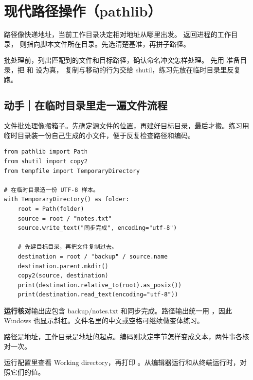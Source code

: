 \par


\section[现代路径操作]{现代路径操作（pathlib）}

路径像快递地址，当前工作目录决定相对地址从哪里出发。
 返回进程的工作目录，
则指向脚本文件所在目录。先选清楚基准，再拼子路径。

批处理前，列出匹配到的文件和目标路径，确认命名冲突怎样处理。
先用  准备目录，把  和  设为真，
复制与移动的行为交给 shutil，练习先放在临时目录里反复跑。

\subsection*{动手｜在临时目录里走一遍文件流程}

文件批处理像搬箱子。先确定源文件的位置，再建好目标目录，最后才搬。练习用临时目录装一份自己生成的小文件，便于反复检查路径和编码。

\begin{lstlisting}[title={\code{copy_note.py}}]
from pathlib import Path
from shutil import copy2
from tempfile import TemporaryDirectory

# 在临时目录造一份 UTF-8 样本。
with TemporaryDirectory() as folder:
    root = Path(folder)
    source = root / "notes.txt"
    source.write_text("同步完成", encoding="utf-8")

    # 先建目标目录，再把文件复制过去。
    destination = root / "backup" / source.name
    destination.parent.mkdir()
    copy2(source, destination)
    print(destination.relative_to(root).as_posix())
    print(destination.read_text(encoding="utf-8"))
\end{lstlisting}

\textbf{运行核对}\enspace 输出应包含 backup/notes.txt 和同步完成。路径输出统一用 ，因此 Windows 也显示斜杠。文件名里的中文或空格可继续做变体练习。

\begin{myunderstanding}
路径是地址，工作目录是地址的起点。编码则决定字节怎样变成文本，两件事各核对一次。
\end{myunderstanding}

\begin{pycharmpractice}
运行配置里查看 Working directory，再打印 。从编辑器运行和从终端运行时，对照它们的值。
\end{pycharmpractice}

